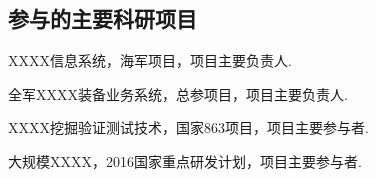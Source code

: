 \begin{resume}
  \section*{参与的主要科研项目} %
  \begin{enumerate}[{[}1{]}]
  \addtolength{\itemsep}{-.36\baselineskip}%
  \item XXXX信息系统，海军项目，项目主要负责人.
  \item 全军XXXX装备业务系统，总参项目，项目主要负责人.
  \item XXXX挖掘验证测试技术，国家863项目，项目主要参与者.
  \item 大规模XXXX，2016国家重点研发计划，项目主要参与者.
  \end{enumerate}
\end{resume}
